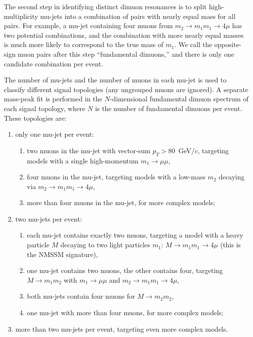 \documentclass[12pt]{cms-tdr}
\begin{document}
The second step in identifying distinct dimuon resonances is to split
high-multiplicity mu-jets into a combination of pairs with nearly
equal mass for all pairs.  For example, a mu-jet containing four muons
from $m_2 \to m_1 m_1 \to 4\mu$ has two potential combinations, and
the combination with more nearly equal masses is much more likely to
correspond to the true mass of $m_1$.  We call the opposite-sign muon
pairs after this step ``fundamental dimuons,'' and there is only one
candidate combination per event.

\label{sec:signal_channels}
The number of mu-jets and the number of muons in each mu-jet is used
to classify different signal topologies (any ungrouped muons are
ignored).  A separate mass-peak fit is performed in the
$N$-dimensional fundamental dimuon spectrum of each signal topology,
where $N$ is the number of fundamental dimuons per event.  These
topologies are:
\begin{enumerate}\renewcommand{\labelenumi}{(\alph{enumi})}
\item only one mu-jet per event:
\begin{enumerate}\renewcommand{\labelenumii}{(a-\arabic{enumii})}
\item two muons in the mu-jet with vector-sum $p_T > 80$~GeV/$c$,
  targeting models with a single high-momentum $m_1 \to \mu\mu$,
\item four muons in the mu-jet, targeting models with a low-mass $m_2$
  decaying via $m_2 \to m_1 m_1 \to 4\mu$,
\item more than four muons in the mu-jet, for more complex
  models;
\end{enumerate}

\item two mu-jets per event:
\begin{enumerate}\renewcommand{\labelenumii}{(b-\arabic{enumii})}
\item each mu-jet contains exactly two muons, targeting a model with a
  heavy particle $M$ decaying to two light particles $m_1$: $M \to m_1
  m_1 \to 4\mu$ (this is the NMSSM signature),
\item one mu-jet contains two muons, the other contains four,
  targeting $M \to m_1 m_2$ with $m_1 \to \mu\mu$ and $m_2 \to m_1 m_1
  \to 4\mu$,
\item both mu-jets contain four muons for $M \to m_2 m_2$,
\item one mu-jet with more than four muons, for more complex
  models;
\end{enumerate}

\item more than two mu-jets per event, targeting even more complex models.
\end{enumerate}
\end{document}
